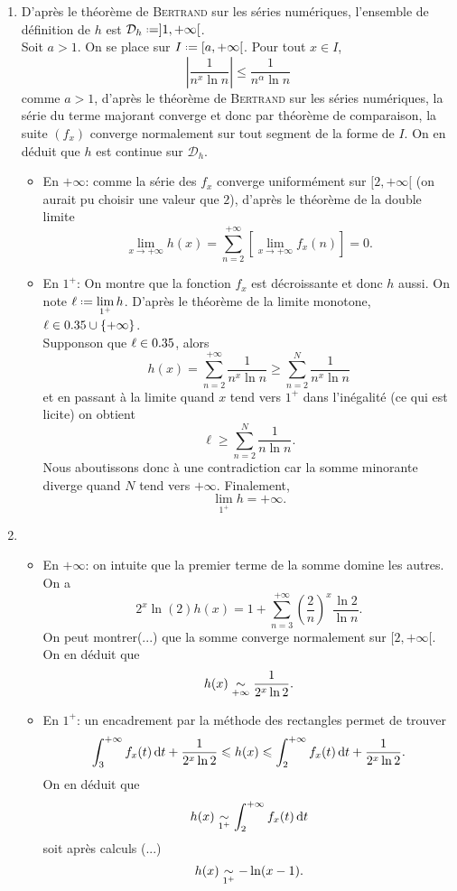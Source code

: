 \begin{solution}
\begin{enumerate}
    On note $f_x : t \mapsto \frac{1}{t^x \ln t}$.
    \item D'après le théorème de \textsc{Bertrand} sur les séries numériques, l'ensemble de définition de $h$ est $\mathcal{D}_h \defeq ]1, + \infty[$. \\
    Soit $a > 1$. On se place sur $I \defeq [a, +\infty[$. Pour tout $x \in I$,
    $$\left| \frac{1}{n^x \ln n} \right| \leqslant \frac{1}{n^\alpha \ln n}$$
    comme $a > 1$, d'après le théorème de \textsc{Bertrand} sur les séries numériques, la série du terme majorant converge et donc par théorème de comparaison, la suite $(f_x)$ converge normalement sur tout segment de la forme de $I$. On en déduit que $h$ est continue sur $\mathcal{D}_h$. 
    \begin{itemize}
        \item En $+ \infty$: comme la série des $f_x$ converge uniformément sur $[2, + \infty[$ (on aurait pu choisir une valeur que $2$), d'après le théorème de la double limite
        $$\lim_{x \to + \infty} h(x) = \sum_{n=2}^{+ \infty} \left[\lim_{x \to +\infty} f_x(n) \right] = 0.$$
        \item En $1^+$: On montre que la fonction $f_x$ est décroissante et donc $h$ aussi. On note $\ell \defeq \lim\limits_{1^+} h$. D'après le théorème de la limite monotone, $\ell \in 0.35 \cup \{ + \infty \}$. \\
        Supponson que $\ell \in 0.35$, alors
        $$h(x) = \sum_{n=2}^{+\infty} \frac{1}{n^x \ln n} \geqslant \sum_{n=2}^N \frac{1}{n^x \ln n}$$
        et en passant à la limite quand $x$ tend vers $1^+$ dans l'inégalité (ce qui est licite) on obtient
        $$\ell \geqslant \sum_{n=2}^N \frac{1}{n \ln n}.$$
        Nous aboutissons donc à une contradiction car la somme minorante diverge quand $N$ tend vers $+ \infty$. Finalement,
        $$\lim_{1^+} h = + \infty.$$
    \end{itemize}
    \item 
    \begin{itemize}
        \item En $+ \infty$: on intuite que la premier terme de la somme domine les autres. On a
        $$2^x \ln(2) h(x) = 1 + \sum_{n=3}^{+\infty} \left(\frac{2}{n}\right)^x \frac{\ln 2}{\ln n}.$$
        On peut montrer(...) que la somme converge normalement sur $[2, +\infty[$. On en déduit que 
        $$h(x) \isEquivTo{+\infty} \frac{1}{2^x \ln 2}.$$
        \item En $1^+$: un encadrement par la méthode des rectangles permet de trouver
        $$\int_{3}^{+\infty} f_x(t) \, \mathrm{d} t + \frac{1}{2^x \ln 2} \leqslant h(x) \leqslant \int_{2}^{+\infty} f_x(t) \, \mathrm{d} t + \frac{1}{2^x \ln 2}.$$
        On en déduit que 
        $$h(x) \isEquivTo{1^+} \int_2^{+\infty} f_x(t) \d t$$
        soit après calculs (...)
        $$h(x) \isEquivTo{1^+} - \ln(x-1).$$
    \end{itemize}
\end{enumerate}
\end{solution}